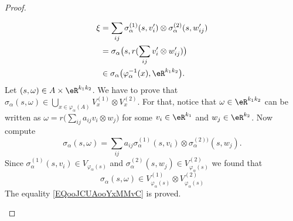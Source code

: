 \begin{proof}
\begin{subproof}
\begin{subproof}
\begin{subequations}
\begin{align}
					\xi & =\sum_{ij}\sigma_{\alpha}^{(1)}(s,v'_i)\otimes \sigma_{\alpha}^{(2)}(s,w_{ij}') \\
					    & =\sigma_{\alpha}\big( s,r(\sum_{ij}v'_i\otimes w'_{ij}) \big)                   \\
					    & \in \sigma_{\alpha}\big( \varphi_{\alpha}^{-1}(x),\eR^{k_1k_2} \big).
				\end{align}
			\end{subequations}
			Let \( (s,\omega)\in A\times \eR^{k_1k_2}\). We have to prove that \( \sigma_{\alpha}(s,\omega)\in \bigcup_{x\in \varphi_{\alpha}(A)}V_x^{(1)}\otimes V_x^{(2)}\). For that, notice that \( \omega\in \eR^{k_1k_2}\) can be written as \( \omega=r\big( \sum_{ij}a_{ij}v_i\otimes w_j \big)\) for some \( v_i\in \eR^{k_1}\) and \( w_j\in \eR^{k_2}\). Now compute
			\begin{equation}
				\sigma_{\alpha}(s,\omega)=\sum_{ij}a_{ij}\sigma_{\alpha}^{(1)}(s,v_i)\otimes \sigma_{\alpha}^{(2))}(s,w_j).
			\end{equation}
			Since \( \sigma_{\alpha}^{(1)}(s,v_i)\in V_{\varphi_{\alpha}(s)}\) and \( \sigma_{\alpha}^{(2)}(s,w_j)\in V_{\varphi_{\alpha}(s)}^{(2)}\) we found that
			\begin{equation}
				\sigma_{\alpha}(s,\omega)\in V_{\varphi_{\alpha}(s)}^{(1)}\otimes V_{\varphi_{\alpha}(s)}^{(2)}
			\end{equation}
			The equality \eqref{EQooJCUAooYxMMvC} is proved.
		\end{subproof}


\end{subproof}
\end{proof}
